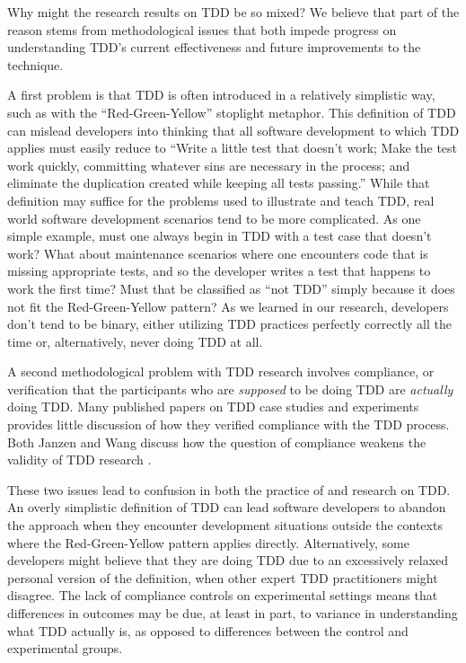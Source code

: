 \documentclass[smallextended]{svjour3}     %
\begin{document}
Why might the research results on TDD be so mixed?  We believe that part of
the reason stems from methodological issues that both impede progress on
understanding TDD's current effectiveness and future improvements to the technique. 

A first problem is that TDD is often introduced in a relatively simplistic
way, such as with the ``Red-Green-Yellow'' stoplight metaphor.  This
definition of TDD can mislead developers into thinking that all software
development to which TDD applies must easily reduce to ``Write a little test that
doesn't work; Make the test work quickly, committing whatever sins are
necessary in the process; and eliminate the duplication created while
keeping all tests passing.''  While that definition may suffice for the 
problems used to illustrate and teach TDD, real world software development
scenarios tend to be more complicated. As one simple example, must one
always begin in TDD with a test case that doesn't work? What about
maintenance scenarios where one encounters code that is missing appropriate
tests, and so the developer writes a test that happens to work the first
time?  Must that be classified as ``not TDD'' simply because it does not
fit the Red-Green-Yellow pattern?  As we learned in our research,
developers don't tend to be binary, either utilizing TDD practices
perfectly correctly all the time or, alternatively, never doing TDD at all.

A second methodological problem with TDD research involves compliance, or
verification that the participants who are {\em supposed} to be doing TDD are
{\em actually} doing TDD. Many published papers on TDD case studies and
experiments provides little discussion of how they verified compliance with
the TDD process.  Both Janzen and Wang discuss how the question of
compliance weakens the validity of TDD research \cite{Janzen:05, Wang:04}.

These two issues lead to confusion in both the practice of and research on
TDD.  An overly simplistic definition of TDD can lead software developers
to abandon the approach when they encounter development situations outside
the contexts where the Red-Green-Yellow pattern applies directly.
Alternatively, some developers might believe that they are doing TDD due to
an excessively relaxed personal version of the definition, when other
expert TDD practitioners might disagree.  The lack of compliance controls
on experimental settings means that differences in outcomes may be due, at
least in part, to variance in understanding what TDD actually is, as
opposed to differences between the control and experimental groups.
\end{document}
